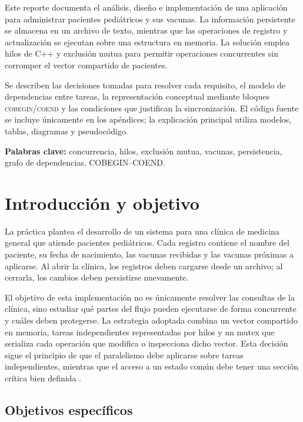 \documentclass[12pt,letterpaper]{article}
\begin{document}
Este reporte documenta el análisis, diseño e implementación de una aplicación
para administrar pacientes pediátricos y sus vacunas. La información persistente
se almacena en un archivo de texto, mientras que las operaciones de registro y
actualización se ejecutan sobre una estructura en memoria. La solución emplea
hilos de C++ y exclusión mutua para permitir operaciones concurrentes sin
corromper el vector compartido de pacientes.

Se describen las decisiones tomadas para resolver cada requisito, el modelo de
dependencias entre tareas, la representación conceptual mediante bloques
\textsc{cobegin}/\textsc{coend} y las condiciones que justifican la
sincronización. El código fuente se incluye únicamente en los apéndices; la
explicación principal utiliza modelos, tablas, diagramas y pseudocódigo.

\noindent\textbf{Palabras clave:} concurrencia, hilos, exclusión mutua, vacunas,
persistencia, grafo de dependencias, COBEGIN--COEND.

\section{Introducción y objetivo}

La práctica plantea el desarrollo de un sistema para una clínica de medicina
general que atiende pacientes pediátricos. Cada registro contiene el nombre del
paciente, su fecha de nacimiento, las vacunas recibidas y las vacunas próximas a
aplicarse. Al abrir la clínica, los registros deben cargarse desde un archivo;
al cerrarla, los cambios deben persistirse nuevamente.

El objetivo de esta implementación no es únicamente resolver las consultas de
la clínica, sino estudiar qué partes del flujo pueden ejecutarse de forma
concurrente y cuáles deben protegerse. La estrategia adoptada combina un
vector compartido en memoria, tareas independientes representadas por hilos y
un mutex que serializa cada operación que modifica o inspecciona dicho vector.
Esta decisión sigue el principio de que el paralelismo debe aplicarse sobre
tareas independientes, mientras que el acceso a un estado común debe tener una
sección crítica bien definida \cite{foster1995,andrewsmultithreaded,herlihy2020}.

\subsection{Objetivos específicos}
\end{document}
